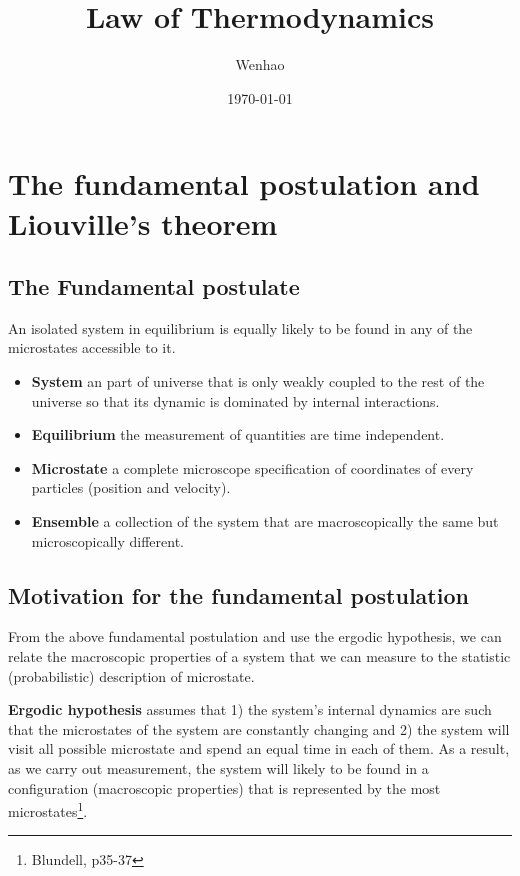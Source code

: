 \documentclass{article}
\begin{document}
\title{Law of Thermodynamics}
\author{Wenhao}
\date{\today}
\maketitle

\tableofcontents

\section{The fundamental postulation and Liouville's theorem}

\subsection{The Fundamental postulate}
An isolated system in equilibrium is equally likely to be found in any
of the microstates accessible to it.

\begin{itemize}
    \item \textbf{System} an part of universe that is only weakly coupled to the rest of the universe 
    so that its dynamic is dominated by internal interactions.
    \item \textbf{Equilibrium} the measurement of quantities are time independent.
    \item \textbf{Microstate} a complete microscope specification of coordinates of every particles (position and velocity).
    \item \textbf{Ensemble} a collection of the system that are macroscopically the same but microscopically different. 
\end{itemize}

\subsection{Motivation for the fundamental postulation}
From the above fundamental postulation and use the ergodic hypothesis, we can relate the macroscopic properties of a system that we can measure 
to the statistic (probabilistic) description of microstate. 

\textbf{Ergodic hypothesis} assumes that 1) the system's internal dynamics are such that the microstates of the system are 
constantly changing and 2) the system will visit all possible microstate and spend an equal time in each of them. 
As a result, as we carry out measurement, the system will likely to be found in a configuration (macroscopic properties) that 
is represented by the most microstates\footnote{Blundell, p35-37}. 
\end{document}
